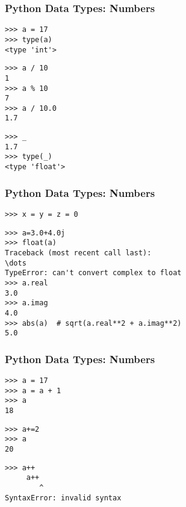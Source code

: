 \begin{frame}[fragile]
    \frametitle{Python Data Types: Numbers}
    \begin{myColorBox}{0.9}{}
\begin{verbatim}
>>> a = 17
>>> type(a)
<type 'int'>
\end{verbatim}
    \end{myColorBox}
    \pause
    \begin{myColorBox}{0.9}{}
\begin{verbatim}
>>> a / 10
1
>>> a % 10
7
>>> a / 10.0
1.7
\end{verbatim}
    \end{myColorBox}
    \pause
    \begin{myColorBox}{0.9}{}
\begin{verbatim}
>>> _
1.7
>>> type(_)
<type 'float'>
\end{verbatim}
    \end{myColorBox}
\end{frame}


\begin{frame}[fragile]
    \frametitle{Python Data Types: Numbers}
    \begin{myColorBox}{0.91}{}
\begin{verbatim}
>>> x = y = z = 0
\end{verbatim}
    \end{myColorBox}
    \pause
    \begin{myColorBox}{0.91}{}
\begin{verbatim}
>>> a=3.0+4.0j
>>> float(a)
Traceback (most recent call last):
\dots
TypeError: can't convert complex to float
>>> a.real
3.0
>>> a.imag
4.0
>>> abs(a)  # sqrt(a.real**2 + a.imag**2)
5.0
\end{verbatim}
    \end{myColorBox}
\end{frame}


\begin{frame}[fragile]
    \frametitle{Python Data Types: Numbers}
    \begin{myColorBox}{0.9}{}
\begin{verbatim}
>>> a = 17
>>> a = a + 1
>>> a
18
\end{verbatim}
    \end{myColorBox}
    \pause
    \begin{myColorBox}{0.9}{}
\begin{verbatim}
>>> a+=2
>>> a
20
\end{verbatim}
    \end{myColorBox}
    \pause
    \begin{myColorBox}{0.9}{}
\begin{verbatim}
>>> a++
     a++
        ^
SyntaxError: invalid syntax
\end{verbatim}
    \end{myColorBox}
\end{frame}

